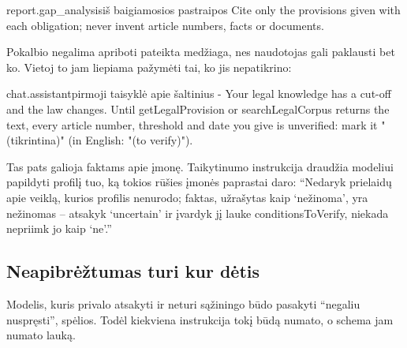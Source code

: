 \begin{promptexcerpt}{report.gap_analysis}{iš baigiamosios pastraipos}
Cite only the provisions given with each obligation; never invent article
numbers, facts or documents.
\end{promptexcerpt}

Pokalbio negalima apriboti pateikta medžiaga, nes naudotojas gali paklausti bet ko. Vietoj to
jam liepiama pažymėti tai, ko jis nepatikrino:

\begin{promptexcerpt}{chat.assistant}{pirmoji taisyklė apie šaltinius}
- Your legal knowledge has a cut-off and the law changes. Until getLegalProvision or searchLegalCorpus returns the text, every article number, threshold and date you give is unverified: mark it "(tikrintina)" (in English: "(to verify)").
\end{promptexcerpt}

Tas pats galioja faktams apie įmonę. Taikytinumo instrukcija draudžia modeliui papildyti
profilį tuo, ką tokios rūšies įmonės paprastai daro: \enquote{Nedaryk prielaidų apie veiklą,
kurios profilis nenurodo; faktas, užrašytas kaip \enquote{nežinoma}, yra nežinomas -- atsakyk
\enquote{uncertain} ir įvardyk jį lauke conditionsToVerify, niekada nepriimk jo kaip \enquote{ne}.}

\subsection{Neapibrėžtumas turi kur dėtis}

Modelis, kuris privalo atsakyti ir neturi sąžiningo būdo pasakyti \enquote{negaliu
nuspręsti}, spėlios. Todėl kiekviena instrukcija tokį būdą numato, o schema jam numato lauką.

